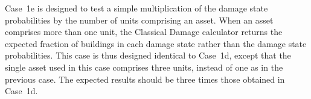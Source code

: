 Case~1e is designed to test a simple multiplication of the damage state probabilities by the number of units comprising an asset. When an asset comprises more than one unit, the Classical Damage calculator returns the expected fraction of buildings in each damage state rather than the damage state probabilities. This case is thus designed identical to Case~1d, except that the single asset used in this case comprises three units, instead of one as in the previous case. The expected results should be three times those obtained in Case~1d.